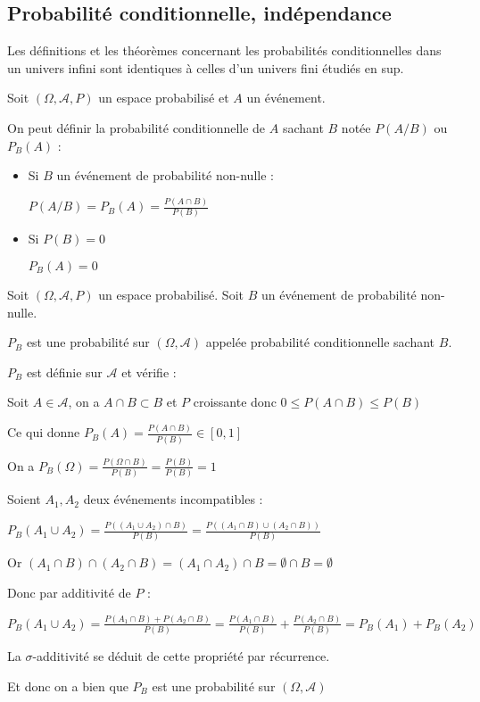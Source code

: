 \documentclass[a4paper,12pt]{book}
\newcommand{\Def}[2]{\begin{tcolorbox}[sharp corners, colback=white,colframe=blue!90!black!75, title=Définition : #1]#2\end{tcolorbox}}
\newcommand{\Prop}[2]{\begin{tcolorbox}[sharp corners, colback=white,colframe=red!90!black!75, title=Proposition : #1]#2\end{tcolorbox}}
\newcommand{\Pre}[1]{\begin{tcolorbox}[sharp corners, colback=white,colframe=green!60!green!30!black!75, title=Preuve]#1\end{tcolorbox}}
\begin{document}
\subsection{Probabilité conditionnelle, indépendance}
Les définitions et les théorèmes concernant les probabilités conditionnelles dans un univers infini sont identiques à celles d'un univers fini étudiés en sup.
\Def{}{Soit $(\Omega, \mathcal{A},P)$ un espace probabilisé et $A$ un événement.
\par On peut définir la probabilité conditionnelle de $A$ sachant $B$ notée $P(A/B)$ ou $P_B(A)$ :\begin{itemize}
\item Si $B$ un événement de probabilité non-nulle : \par\begin{center}$P(A/B)=P_B(A)=\frac{P(A\cap B)}{P(B)}$\end{center}
\item Si $P(B)=0$ \par\begin{center} $P_B(A)=0$\end{center}
\end{itemize}}
\Prop{}{Soit $(\Omega, \mathcal{A},P)$ un espace probabilisé. Soit $B$ un événement de probabilité non-nulle.
\par $P_B$ est une probabilité sur $(\Omega, \mathcal{A})$ appelée probabilité conditionnelle sachant $B$.}
\Pre{$P_B$ est définie sur $\mathcal{A}$ et vérifie :
\par Soit $A\in\mathcal{A}$, on a $A\cap B\subset B$ et $P$ croissante donc $0\leq P(A\cap B)\leq P(B)$
\par Ce qui donne $P_B(A)=\frac{P(A\cap B)}{P(B)}\in[0,1]$
\par On a $P_B(\Omega) =\frac{P(\Omega\cap B)}{P(B)}=\frac{P(B)}{P(B)}=1$
\par Soient $A_1, A_2$ deux événements incompatibles :
\par $P_B(A_1\cup A_2)=\frac{P((A_1\cup A_2)\cap B)}{P(B)}=\frac{P((A_1\cap B)\cup (A_2\cap B))}{P(B)}$
\par Or $(A_1\cap B)\cap(A_2\cap B) = (A_1\cap A_2)\cap B=\emptyset\cap B=\emptyset$
\par Donc par additivité de $P$ :
\par $P_B(A_1\cup A_2)=\frac{P(A_1\cap B)+P(A_2\cap B)}{P(B)} = \frac{P(A_1\cap B)}{P(B)}+\frac{P(A_2\cap B)}{P(B)}=P_B(A_1)+P_B(A_2)$
\par La $\sigma$-additivité se déduit de cette propriété par récurrence.
\par Et donc on a bien que $P_B$ est une probabilité sur $(\Omega, \mathcal{A})$}
\end{document}
